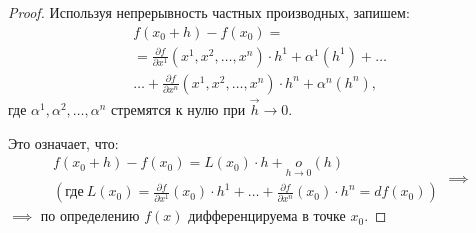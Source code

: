 \begin{proof}
    Используя непрерывность частных производных, запишем:
    \begin{multline*}
        f(x_0 + h) - f(x_0) = \\
        = \frac{\partial f}{\partial x^1}(x^1, x^2, \ldots, x^n) \cdot h^1 + \alpha^1(h^1) + \ldots \\
        \ldots + \frac{\partial f}{\partial x^n}(x^1, x^2, \ldots, x^n) \cdot h^n + \alpha^n(h^n),
    \end{multline*}
    где $\alpha^1,\alpha^2,\ldots,\alpha^n$ стремятся к нулю при $\vec{h}\rightarrow0$.

    Это означает, что:
    \[
        \begin{array}{c}
            f(x_0 + h) - f(x_0) = L(x_0)\cdot h + \underset{h\rightarrow0}{o}(h) \\
            \left(\text{где} \ L(x_0) = \frac{\partial f}{\partial x^1}(x_0)\cdot h^1 + \ldots + \frac{\partial f}{\partial x^n}(x_0) \cdot h^n = df(x_0)\right)
        \end{array} \implies
    \]$\implies$ по определению $f(x)$ дифференцируема в точке $x_0$.
\end{proof}